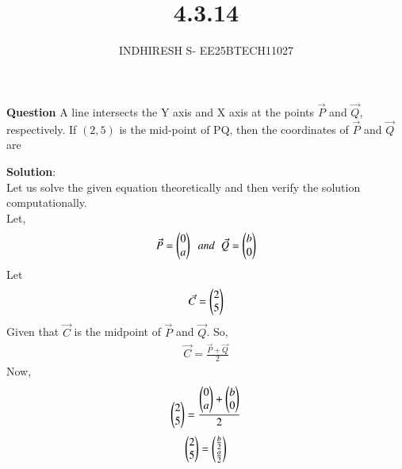 \documentclass[journal]{IEEEtran}
\theoremstyle{remark}
\begin{document}

\onecolumn

\title{4.3.14}
\author{INDHIRESH S- EE25BTECH11027}
\maketitle


\renewcommand{\thefigure}{\theenumi}
\renewcommand{\thetable}{\theenumi}

\textbf{Question} A line intersects the Y axis and X axis at the points $\Vec{P}$ and $\Vec{Q}$, respectively. If $(2, 5)$ is the mid-point of PQ, then the coordinates of $\Vec{P}$ and $\Vec{Q}$ are 
   
\textbf{Solution}:\\
Let us solve the given equation theoretically and then verify the solution computationally. \\
Let,
\begin{align}
     \Vec{P}=\begin{pmatrix}0\\a\end{pmatrix}\;\;and\;\;\Vec{Q}=\begin{pmatrix}b\\0\end{pmatrix}
\end{align}
Let
\begin{align}
    \Vec{C}=\begin{pmatrix}2\\5\end{pmatrix}
\end{align}
Given that $\Vec{C}$ is the midpoint of $\Vec{P}$ and $\Vec{Q}$. So,
\begin{align}
    \Vec{C}=\frac{\Vec{P}+\Vec{Q}}{2}
\end{align}
Now,
\begin{align}
\begin{pmatrix}2\\5\end{pmatrix}=\frac{\begin{pmatrix}0\\a\end{pmatrix}+\begin{pmatrix}b\\0\end{pmatrix}}{2}
\end{align}
\begin{align}
    \begin{pmatrix}2\\5\end{pmatrix}=\begin{pmatrix}\frac{b}{2}\\\frac{a}{2}\end{pmatrix}
\end{align}
\end{document}

